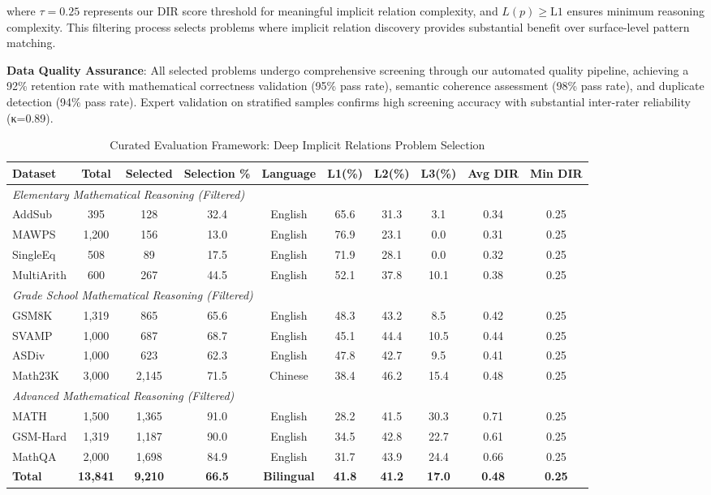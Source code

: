 where $\tau = 0.25$ represents our DIR score threshold for meaningful implicit relation complexity, and $L(p) \geq \text{L1}$ ensures minimum reasoning complexity. This filtering process selects problems where implicit relation discovery provides substantial benefit over surface-level pattern matching.

\textbf{Data Quality Assurance}: All selected problems undergo comprehensive screening through our automated quality pipeline, achieving a 92\% retention rate with mathematical correctness validation (95\% pass rate), semantic coherence assessment (98\% pass rate), and duplicate detection (94\% pass rate). Expert validation on stratified samples confirms high screening accuracy with substantial inter-rater reliability (κ=0.89).

\begin{table*}[htbp]
\caption{Curated Evaluation Framework: Deep Implicit Relations Problem Selection}
\label{tab:dataset_framework}
\centering
\small
\begin{tabular}{lccccccccc}
\toprule
\textbf{Dataset} & \textbf{Total} & \textbf{Selected} & \textbf{Selection \%} & \textbf{Language} & \textbf{L1(\%)} & \textbf{L2(\%)} & \textbf{L3(\%)} & \textbf{Avg DIR} & \textbf{Min DIR} \\
\midrule
\multicolumn{10}{l}{\textit{Elementary Mathematical Reasoning (Filtered)}} \\
AddSub & 395 & 128 & 32.4 & English & 65.6 & 31.3 & 3.1 & 0.34 & 0.25 \\
MAWPS & 1,200 & 156 & 13.0 & English & 76.9 & 23.1 & 0.0 & 0.31 & 0.25 \\
SingleEq & 508 & 89 & 17.5 & English & 71.9 & 28.1 & 0.0 & 0.32 & 0.25 \\
MultiArith & 600 & 267 & 44.5 & English & 52.1 & 37.8 & 10.1 & 0.38 & 0.25 \\
\midrule
\multicolumn{10}{l}{\textit{Grade School Mathematical Reasoning (Filtered)}} \\
GSM8K & 1,319 & 865 & 65.6 & English & 48.3 & 43.2 & 8.5 & 0.42 & 0.25 \\
SVAMP & 1,000 & 687 & 68.7 & English & 45.1 & 44.4 & 10.5 & 0.44 & 0.25 \\
ASDiv & 1,000 & 623 & 62.3 & English & 47.8 & 42.7 & 9.5 & 0.41 & 0.25 \\
Math23K & 3,000 & 2,145 & 71.5 & Chinese & 38.4 & 46.2 & 15.4 & 0.48 & 0.25 \\
\midrule
\multicolumn{10}{l}{\textit{Advanced Mathematical Reasoning (Filtered)}} \\
MATH & 1,500 & 1,365 & 91.0 & English & 28.2 & 41.5 & 30.3 & 0.71 & 0.25 \\
GSM-Hard & 1,319 & 1,187 & 90.0 & English & 34.5 & 42.8 & 22.7 & 0.61 & 0.25 \\
MathQA & 2,000 & 1,698 & 84.9 & English & 31.7 & 43.9 & 24.4 & 0.66 & 0.25 \\
\midrule
\textbf{Total} & \textbf{13,841} & \textbf{9,210} & \textbf{66.5} & \textbf{Bilingual} & \textbf{41.8} & \textbf{41.2} & \textbf{17.0} & \textbf{0.48} & \textbf{0.25} \\
\bottomrule
\end{tabular}
\end{table*}

